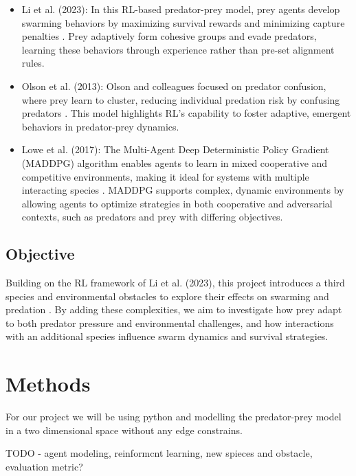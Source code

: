 \documentclass[9pt]{pnas-new}
\begin{document}
\begin{itemize}
    \item Li et al. (2023): In this RL-based predator-prey model, prey agents develop swarming behaviors by maximizing survival rewards and minimizing capture penalties \cite{li2023predator}. Prey adaptively form cohesive groups and evade predators, learning these behaviors through experience rather than pre-set alignment rules.

    \item Olson et al. (2013): Olson and colleagues focused on predator confusion, where prey learn to cluster, reducing individual predation risk by confusing predators \cite{olson2013predator}. This model highlights RL's capability to foster adaptive, emergent behaviors in predator-prey dynamics.

    \item Lowe et al. (2017): The Multi-Agent Deep Deterministic Policy Gradient (MADDPG) algorithm enables agents to learn in mixed cooperative and competitive environments, making it ideal for systems with multiple interacting species \cite{lowe2017}. MADDPG supports complex, dynamic environments by allowing agents to optimize strategies in both cooperative and adversarial contexts, such as predators and prey with differing objectives.
\end{itemize}

\subsection{Objective}

Building on the RL framework of Li et al. (2023), this project introduces a third species and environmental obstacles to explore their effects on swarming and predation \cite{li2023predator}. By adding these complexities, we aim to investigate how prey adapt to both predator pressure and environmental challenges, and how interactions with an additional species influence swarm dynamics and survival strategies.


\section*{Methods}

For our project we will be using python and modelling the predator-prey model in a two dimensional space without any edge constrains. 

TODO - 
agent modeling, reinformcnt learning, new spieces and obstacle, evaluation metric?
\end{document}
